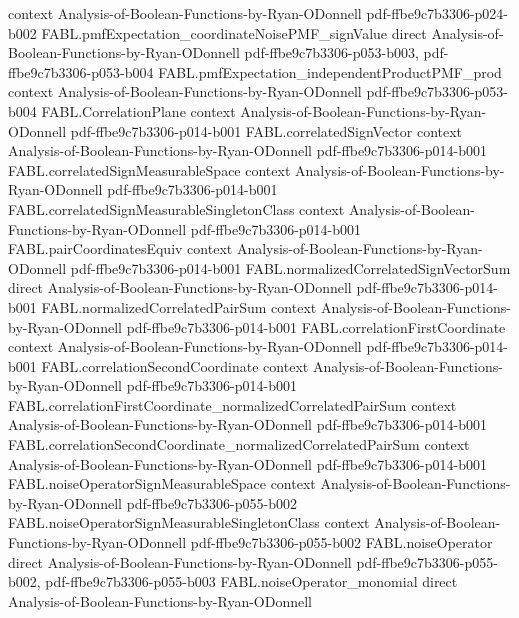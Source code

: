 \begin{theorem}
  {context}
  {Analysis-of-Boolean-Functions-by-Ryan-ODonnell}
  {pdf-ffbe9c7b3306-p024-b002}
\proofstep
  {FABL.pmfExpectation_coordinateNoisePMF_signValue}
  {direct}
  {Analysis-of-Boolean-Functions-by-Ryan-ODonnell}
  {pdf-ffbe9c7b3306-p053-b003,
    pdf-ffbe9c7b3306-p053-b004}
\proofstep
  {FABL.pmfExpectation_independentProductPMF_prod}
  {context}
  {Analysis-of-Boolean-Functions-by-Ryan-ODonnell}
  {pdf-ffbe9c7b3306-p053-b004}
\proofstep
  {FABL.CorrelationPlane}
  {context}
  {Analysis-of-Boolean-Functions-by-Ryan-ODonnell}
  {pdf-ffbe9c7b3306-p014-b001}
\proofstep
  {FABL.correlatedSignVector}
  {context}
  {Analysis-of-Boolean-Functions-by-Ryan-ODonnell}
  {pdf-ffbe9c7b3306-p014-b001}
\proofstep
  {FABL.correlatedSignMeasurableSpace}
  {context}
  {Analysis-of-Boolean-Functions-by-Ryan-ODonnell}
  {pdf-ffbe9c7b3306-p014-b001}
\proofstep
  {FABL.correlatedSignMeasurableSingletonClass}
  {context}
  {Analysis-of-Boolean-Functions-by-Ryan-ODonnell}
  {pdf-ffbe9c7b3306-p014-b001}
\proofstep
  {FABL.pairCoordinatesEquiv}
  {context}
  {Analysis-of-Boolean-Functions-by-Ryan-ODonnell}
  {pdf-ffbe9c7b3306-p014-b001}
\proofstep
  {FABL.normalizedCorrelatedSignVectorSum}
  {direct}
  {Analysis-of-Boolean-Functions-by-Ryan-ODonnell}
  {pdf-ffbe9c7b3306-p014-b001}
\proofstep
  {FABL.normalizedCorrelatedPairSum}
  {context}
  {Analysis-of-Boolean-Functions-by-Ryan-ODonnell}
  {pdf-ffbe9c7b3306-p014-b001}
\proofstep
  {FABL.correlationFirstCoordinate}
  {context}
  {Analysis-of-Boolean-Functions-by-Ryan-ODonnell}
  {pdf-ffbe9c7b3306-p014-b001}
\proofstep
  {FABL.correlationSecondCoordinate}
  {context}
  {Analysis-of-Boolean-Functions-by-Ryan-ODonnell}
  {pdf-ffbe9c7b3306-p014-b001}
\proofstep
  {FABL.correlationFirstCoordinate_normalizedCorrelatedPairSum}
  {context}
  {Analysis-of-Boolean-Functions-by-Ryan-ODonnell}
  {pdf-ffbe9c7b3306-p014-b001}
\proofstep
  {FABL.correlationSecondCoordinate_normalizedCorrelatedPairSum}
  {context}
  {Analysis-of-Boolean-Functions-by-Ryan-ODonnell}
  {pdf-ffbe9c7b3306-p014-b001}
\proofstep
  {FABL.noiseOperatorSignMeasurableSpace}
  {context}
  {Analysis-of-Boolean-Functions-by-Ryan-ODonnell}
  {pdf-ffbe9c7b3306-p055-b002}
\proofstep
  {FABL.noiseOperatorSignMeasurableSingletonClass}
  {context}
  {Analysis-of-Boolean-Functions-by-Ryan-ODonnell}
  {pdf-ffbe9c7b3306-p055-b002}
\proofstep
  {FABL.noiseOperator}
  {direct}
  {Analysis-of-Boolean-Functions-by-Ryan-ODonnell}
  {pdf-ffbe9c7b3306-p055-b002,
    pdf-ffbe9c7b3306-p055-b003}
\proofstep
  {FABL.noiseOperator_monomial}
  {direct}
  {Analysis-of-Boolean-Functions-by-Ryan-ODonnell}

\end{theorem}
